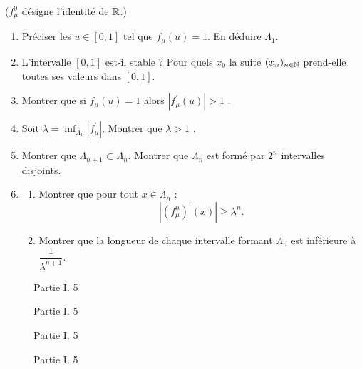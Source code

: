 ($f_\mu ^0$ désigne l'identité de $\mathbb{R}$.)
\begin{enumerate}
\item Préciser les $u\in[0,1]$ tel que $f_\mu (u)=1$. En déduire $\Lambda_1$.
\item L'intervalle $[0,1]$ est-il stable ? Pour quels $x_0$ la suite $(x_n)_{n\in\mathbb{N}}$ prend-elle toutes ses valeurs dans $[0,1]$.
\item Montrer que si $f_\mu (u)=1$ alors $|f_\mu ^\prime(u)|>1$ .
\item Soit $\lambda=\inf_{\Lambda_1}|f_\mu ^\prime|$. Montrer que $\lambda >1$ .
\item Montrer que $\Lambda_{n+1}\subset\Lambda_n$. Montrer que $\Lambda_n$ est formé par $2^n$ intervalles disjoints.
\item \begin{enumerate}
\item Montrer que pour tout $x\in \Lambda_n$ :
\[
|(f_\mu ^n)^\prime(x)|\geq \lambda ^n .
\] 
\item Montrer que la longueur de chaque intervalle formant $\Lambda_n$ est inférieure à $\dfrac{1}{\lambda^{n+1}}$.
\end{enumerate}
\end{enumerate}
\clearpage
\begin{figure}[p]
 \centering
 
 \caption{Partie I. 5}
 \label{fig:Elogistic_1}
\end{figure}
\begin{figure}[p]
 \centering
 
 \caption{Partie I. 5}
 \label{fig:Elogistic_2}
\end{figure}
\begin{figure}[p]
 \centering
 
 \caption{Partie I. 5}
 \label{fig:Elogistic_3}
\end{figure}
\begin{figure}[p]
 \centering
 
 \caption{Partie I. 5}
 \label{fig:Elogistic_4}
\end{figure}
\clearpage


